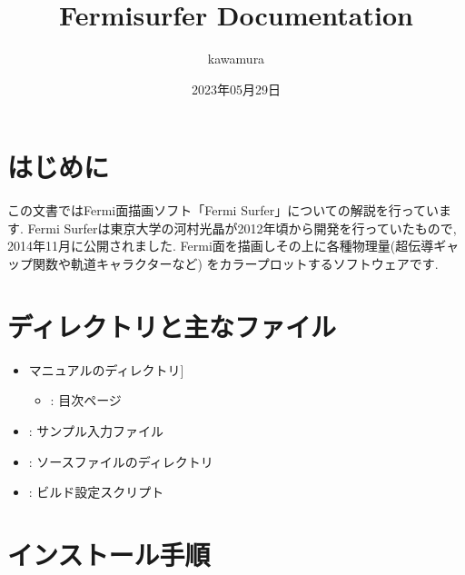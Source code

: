 \documentclass[letterpaper,10pt,dvipdfmx,openany]{sphinxmanual}
\title{Fermisurfer Documentation}
\date{2023年05月29日}
\author{kawamura}
\begin{document}
\pagestyle{empty}
\sphinxmaketitle
\pagestyle{plain}
\sphinxtableofcontents
\pagestyle{normal}
\label{\detokenize{index::doc}}


\sphinxstepscope


\chapter{はじめに}
\label{\detokenize{overview:id1}}\label{\detokenize{overview::doc}}
\sphinxAtStartPar
この文書ではFermi面描画ソフト「Fermi Surfer」についての解説を行っています.
Fermi Surferは東京大学の河村光晶が2012年頃から開発を行っていたもので,
2014年11月に公開されました.
Fermi面を描画しその上に各種物理量(超伝導ギャップ関数や軌道キャラクターなど)
をカラープロットするソフトウェアです.

\sphinxstepscope


\chapter{ディレクトリと主なファイル}
\label{\detokenize{file:id1}}\label{\detokenize{file::doc}}\begin{itemize}
\item {} \begin{description}
\sphinxlineitem{\sphinxcode{\sphinxupquote{doc/}}}{[}マニュアルのディレクトリ{]}\begin{itemize}
\item {} 
\sphinxAtStartPar
{} : 目次ページ

\end{itemize}

\end{description}

\item {} 
\sphinxAtStartPar
{} : サンプル入力ファイル

\item {} 
\sphinxAtStartPar
{} : ソースファイルのディレクトリ

\item {} 
\sphinxAtStartPar
{} : ビルド設定スクリプト

\end{itemize}

\sphinxstepscope


\chapter{インストール手順}
\label{\detokenize{install:id1}}\label{\detokenize{install::doc}}
\end{document}

